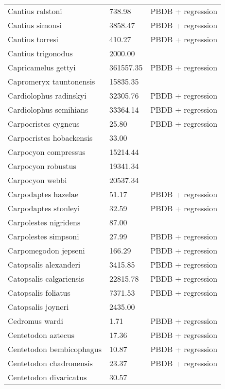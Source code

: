 \documentclass{article}
\begin{document}
\begin{center}
\begin{longtable}{p{} p{} p{}}
    Cantius ralstoni & 738.98 & PBDB + regression \\ 
    Cantius simonsi & 3858.47 & PBDB + regression \\ 
    Cantius torresi & 410.27 & PBDB + regression \\ 
    Cantius trigonodus & 2000.00 & \cite{Soligo2006} \\ 
    Capricamelus gettyi & 361557.35 & PBDB + regression \\ 
    Capromeryx tauntonensis & 15835.35 & \cite{Tomiya2013} \\ 
    Cardiolophus radinskyi & 32305.76 & PBDB + regression \\ 
    Cardiolophus semihians & 33364.14 & PBDB + regression \\ 
    Carpocristes cygneus & 25.80 & PBDB + regression \\ 
    Carpocristes hobackensis & 33.00 & \cite{Soligo2006} \\ 
    Carpocyon compressus & 15214.44 & \cite{Tomiya2013} \\ 
    Carpocyon robustus & 19341.34 & \cite{Tomiya2013} \\ 
    Carpocyon webbi & 20537.34 & \cite{Tomiya2013} \\ 
    Carpodaptes hazelae & 51.17 & PBDB + regression \\ 
    Carpodaptes stonleyi & 32.59 & PBDB + regression \\ 
    Carpolestes nigridens & 87.00 & \cite{Scott2003a} \\ 
    Carpolestes simpsoni & 27.99 & PBDB + regression \\ 
    Carpomegodon jepseni & 166.29 & PBDB + regression \\ 
    Catopsalis alexanderi & 3415.85 & PBDB + regression \\ 
    Catopsalis calgariensis & 22815.78 & PBDB + regression \\ 
    Catopsalis foliatus & 7371.53 & PBDB + regression \\ 
    Catopsalis joyneri & 2435.00 & \cite{Wilson2012} \\ 
    Cedromus wardi & 1.71 & PBDB + regression \\ 
    Centetodon aztecus & 17.36 & PBDB + regression \\ 
    Centetodon bembicophagus & 10.87 & PBDB + regression \\ 
    Centetodon chadronensis & 23.37 & PBDB + regression \\ 
    Centetodon divaricatus & 30.57 & \cite{Tomiya2013} \\ 

\end{longtable}
\end{center}
\end{document}
